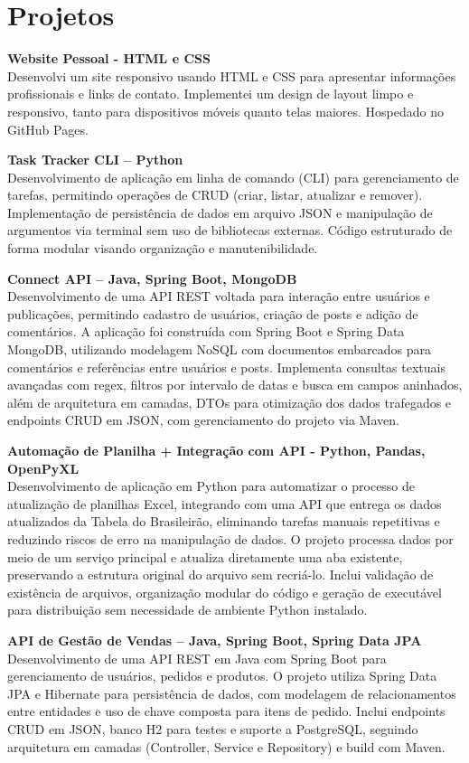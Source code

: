 \documentclass[a4paper,10pt]{article}
\begin{document}
\section{Projetos}
\textbf{Website Pessoal - HTML e CSS} \\
Desenvolvi um site responsivo usando HTML e CSS para apresentar informações profissionais e links de contato. Implementei um design de layout limpo e responsivo, tanto para dispositivos móveis quanto telas maiores. Hospedado no GitHub Pages.

\textbf{Task Tracker CLI – Python} \\
Desenvolvimento de aplicação em linha de comando (CLI) para gerenciamento de tarefas, permitindo operações de CRUD (criar, listar, atualizar e remover). Implementação de persistência de dados em arquivo JSON e manipulação de argumentos via terminal sem uso de bibliotecas externas. Código estruturado de forma modular visando organização e manutenibilidade.  

\textbf{Connect API – Java, Spring Boot, MongoDB} \\
Desenvolvimento de uma API REST voltada para interação entre usuários e publicações, permitindo cadastro de usuários, criação de posts e adição de comentários. A aplicação foi construída com Spring Boot e Spring Data MongoDB, utilizando modelagem NoSQL com documentos embarcados para comentários e referências entre usuários e posts. Implementa consultas textuais avançadas com regex, filtros por intervalo de datas e busca em campos aninhados, além de arquitetura em camadas, DTOs para otimização dos dados trafegados e endpoints CRUD em JSON, com gerenciamento do projeto via Maven.

\textbf{Automação de Planilha + Integração com API - Python, Pandas, OpenPyXL} \\
Desenvolvimento de aplicação em Python para automatizar o processo de atualização de planilhas Excel, integrando com uma API que entrega os dados atualizados da Tabela do Brasileirão, eliminando tarefas manuais repetitivas e reduzindo riscos de erro na manipulação de dados. O projeto processa dados por meio de um serviço principal e atualiza diretamente uma aba existente, preservando a estrutura original do arquivo sem recriá-lo. Inclui validação de existência de arquivos, organização modular do código e geração de executável para distribuição sem necessidade de ambiente Python instalado.

\textbf{API de Gestão de Vendas – Java, Spring Boot, Spring Data JPA} \\
Desenvolvimento de uma API REST em Java com Spring Boot para gerenciamento de usuários, pedidos e produtos. O projeto utiliza Spring Data JPA e Hibernate para persistência de dados, com modelagem de relacionamentos entre entidades e uso de chave composta para itens de pedido. Inclui endpoints CRUD em JSON, banco H2 para testes e suporte a PostgreSQL, seguindo arquitetura em camadas (Controller, Service e Repository) e build com Maven.
\end{document}
